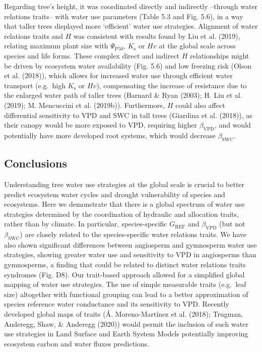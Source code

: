 \documentclass[11pt,twoside]{reedthesis}
\begin{document}
Regarding tree's height, it was coordinated directly and indirectly
--through water relations traits-- with water use parameters (Table 5.3
and Fig. 5.6), in a way that taller trees displayed more `efficient'
water use strategies. Alignment of water relations traits and \(H\) was
consistent with results found by Liu et al. (2019), relating maximum
plant size with \(\Psi_{\text{P50}}\), \(K_\text{s}\) or \(Hv\) at the
global scale across species and life forms. These complex direct and
indirect \(H\) relationships might be driven by ecosystem water
availability (Fig. 5.6) and low freezing risk (Olson et al. (2018)),
which allows for increased water use through efficient water transport
(e.g.~high \(K_\text{s}\) or \(Hv\)), compensating the increase of
resistance due to the enlarged water path of taller trees (Barnard \&
Ryan (2003); H. Liu et al. (2019); M. Mencuccini et al. (2019b)).
Furthermore, \(H\) could also affect differential sensitivity to VPD and
SWC in tall trees (Giardina et al. (2018)), as their canopy would be
more exposed to VPD, requiring higher \(\beta_{\text{VPD}}\), and would
potentially have more developed root systems, which would decrease
\(\beta_{\text{SWC}}\).\par

\subsection{Conclusions}\label{conclusions}

Understanding tree water use strategies at the global scale is crucial
to better predict ecosystem water cycles and drought vulnerability of
species and ecosystems. Here we demonstrate that there is a global
spectrum of water use strategies determined by the coordination of
hydraulic and allocation traits, rather than by climate. In particular,
species-specific \(G_{\text{REF}}\) and \(\beta_{\text{VPD}}\) (but not
\(\beta_{\text{SWC}}\)) are closely related to the species-specific
water relations traits. We have also shown significant differences
between angiosperm and gymnosperm water use strategies, showing greater
water use and sensitivity to VPD in angiosperms than gymnosperms, a
finding that could be related to distinct water relations traits
syndromes (Fig. D8). Our trait-based approach allowed for a simplified
global mapping of water use strategies. The use of simple measurable
traits (e.g.~leaf size) altogether with functional grouping can lead to
a better approximation of species reference water conductance and its
sensitivity to VPD. Recently developed global maps of traits (Á.
Moreno-Martínez et al. (2018); Trugman, Anderegg, Shaw, \& Anderegg
(2020)) would permit the inclusion of such water use strategies in Land
Surface and Earth System Models potentially improving ecosystem carbon
and water fluxes predictions.\par
\end{document}

